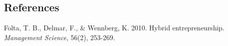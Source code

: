 \documentclass[12pt]{article}
\begin{document}
%        
%
%        

\subsection*{References}

\begin{description}

\item Folta, T. B., Delmar, F., & Wennberg, K. 2010. Hybrid entrepreneurship. \textit{Management Science}, 56(2), 253-269.


\end{description}
\end{document}
